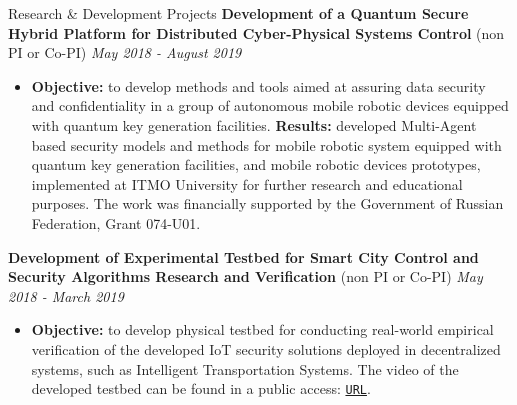 \documentclass[10pt]{resume} %
\begin{document}
\begin{rSection}{Research \& Development Projects}
{\bf Development of a Quantum Secure Hybrid Platform for Distributed Cyber-Physical Systems Control} (non PI or Co-PI) \hspace*{\fill} {\em May 2018 - August 2019}
\begin{itemize}
\itemsep-0.5em
\item \textbf{Objective:} to develop methods and tools aimed at assuring data security and confidentiality in a group of autonomous mobile robotic devices equipped with quantum key generation facilities. \textbf{Results:} developed Multi-Agent based security models and methods for mobile robotic system equipped with quantum key generation facilities, and mobile robotic devices prototypes, implemented at ITMO University for further research and educational purposes. The work was financially supported by the Government of Russian Federation, Grant 074-U01.
\end{itemize}

{\bf Development of Experimental Testbed for Smart City Control and Security Algorithms Research and Verification} (non PI or Co-PI) \hfill \hfill {\em May 2018 - March 2019}
\begin{itemize}
\itemsep-0.5em
\item \textbf{Objective:} to develop physical testbed for conducting real-world empirical verification of the developed IoT security solutions deployed in decentralized systems, such as Intelligent Transportation Systems. 
The video of the developed testbed can be found in a public access: \href{https://vk.com/video-175152723_456239017}{\nolinkurl{URL}}.
\end{itemize}
\end{rSection}








\end{document}
